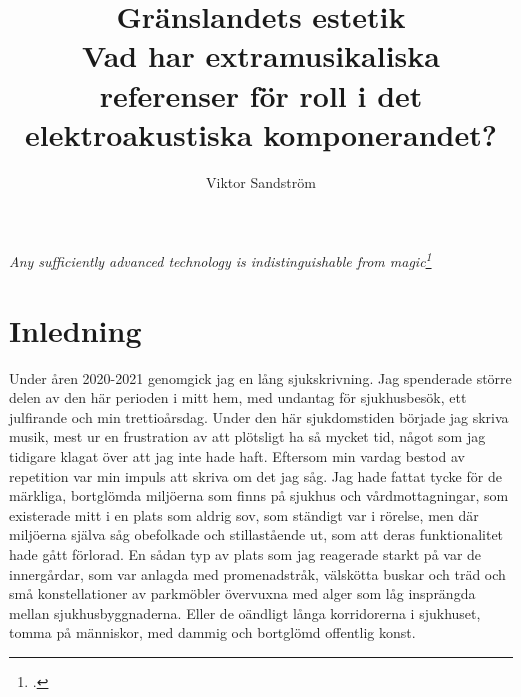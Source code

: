 \documentclass{article}
\title{%
	Gränslandets estetik \\
	\large{Vad har extramusikaliska referenser för roll i det elektroakustiska komponerandet?}
}
\author{Viktor Sandström}
\begin{document}
\maketitle
\newpage
\tableofcontents
\newpage



\begin{center}
	\hspace{0pt}
	\vfill
	\emph{Any sufficiently advanced technology is indistinguishable from magic\footcite{ArthurCClarkeMagic}}
	\vfill
	\hspace{0pt}
\end{center}
\newpage

\section{Inledning}
Under åren 2020-2021 genomgick jag en lång sjukskrivning. Jag spenderade större delen av den här perioden i
mitt hem, med undantag för sjukhusbesök, ett julfirande och min trettioårsdag. Under den här sjukdomstiden
började jag skriva musik, mest ur en frustration av att plötsligt ha så mycket tid, något som jag
tidigare klagat över att jag inte hade haft. Eftersom min vardag bestod av repetition var min impuls att
skriva om det jag såg. Jag hade fattat tycke för de märkliga, bortglömda miljöerna som finns på sjukhus och
vårdmottagningar, som existerade mitt i en plats som aldrig sov, som ständigt var i rörelse, men där miljöerna
själva såg obefolkade och stillastående ut, som att deras funktionalitet hade gått förlorad. En sådan typ av
plats som jag reagerade starkt på var de innergårdar, som var anlagda med promenadstråk, välskötta buskar
och träd och små konstellationer av parkmöbler övervuxna med alger som låg insprängda mellan
sjukhusbyggnaderna. Eller de oändligt långa korridorerna i sjukhuset, tomma på människor, med dammig och
bortglömd offentlig konst. 
\end{document}
